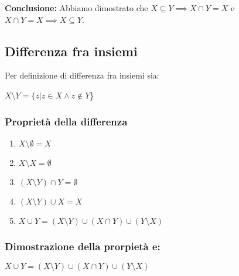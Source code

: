 \documentclass[article,12pt]{book}
\begin{document}
\begin{enumerate}
\textbf{Conclusione:} Abbiamo dimostrato che \( X \subseteq Y \implies X \cap Y = X \) e \( X \cap Y = X \implies X \subseteq Y \).

\newpage

\subsection{Differenza fra insiemi}
Per definizione di differenza fra insiemi sia:
\begin{center}
    $X \setminus Y = \{z|z \in X \land  z \notin Y$\}
\end{center}

\begin{center}
\end{center}






\subsubsection{Proprietà della differenza}

\begin{enumerate}
    \item \(X \setminus \emptyset = X\)
    \item \(X \setminus X = \emptyset\)
    \item \((X \setminus Y) \cap Y = \emptyset\)
    \item \((X \setminus Y) \cup X = X\)
    \item \(X \cup Y = (X \setminus Y) \cup (X \cap Y) \cup (Y \setminus X)\)
\end{enumerate}

\subsubsection{Dimostrazione della prorpietà e:}
\begin{center}
    \(X \cup Y = (X \setminus Y) \cup (X \cap Y) \cup (Y \setminus X)\)
\end{center}


\end{enumerate}
\end{document}
